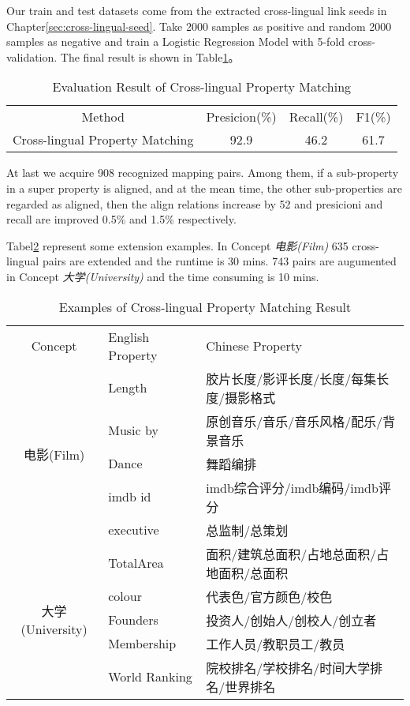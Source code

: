 \documentclass[runningheads,a4paper]{llncs}
\begin{document}
Our train and test datasets come from the extracted cross-lingual link seeds in Chapter\ref{sec:cross-lingual-seed}. Take 2000 samples as positive and random 2000 samples as negative and train a Logistic Regression Model with 5-fold cross-validation. The final result is shown in Table\ref{tab:property-matching-result}。
\begin{table}[htb]
  \centering
  \caption{Evaluation Result of Cross-lingual Property Matching}
  \label{tab:property-matching-result}
    \begin{tabular}{cccc}
      {Method} & {Presicion(\%)} & {Recall(\%)} & {F1(\%)}  \\
      Cross-lingual Property Matching & 92.9 & 46.2 & 61.7 \\
    \end{tabular}
\end{table}

At last we acquire 908 recognized mapping pairs. Among them, if a sub-property in a super property is aligned, and at the mean time, the other sub-properties are regarded as aligned, then the align relations increase by 52 and presicioni and recall are improved 0.5\% and 1.5\% respectively.

Tabel\ref{tab:property-matching-examples} represent some extension examples. In Concept \textit{电影(Film)} 635 cross-lingual pairs are extended and the runtime is 30 mins. 743 pairs are augumented in Concept \textit{大学(University)} and the time consuming is 10 mins.

\begin{table}[htb]
  \centering
  \caption{Examples of Cross-lingual Property Matching Result}
  \label{tab:property-matching-examples}
    \begin{tabular}{cll}
      {Concept} & {English Property} & {Chinese Property} \\
      \multirow{5}{*}{电影(Film)}
      & Length        & 胶片长度/影评长度/长度/每集长度/摄影格式  \\
      & Music by      & 原创音乐/音乐/音乐风格/配乐/背景音乐      \\
      & Dance         & 舞蹈编排                                  \\
      & imdb id       & imdb综合评分/imdb编码/imdb评分            \\
      & executive     & 总监制/总策划                             \\
      \multirow{5}{*}{大学(University)}
      & TotalArea      & 面积/建筑总面积/占地总面积/占地面积/总面积  \\
      & colour         & 代表色/官方颜色/校色                  \\
      & Founders       & 投资人/创始人/创校人/创立者           \\
      & Membership     & 工作人员/教职员工/教员                \\
      & World Ranking  & 院校排名/学校排名/时间大学排名/世界排名     \\
    \end{tabular}
\end{table}
\end{document}
